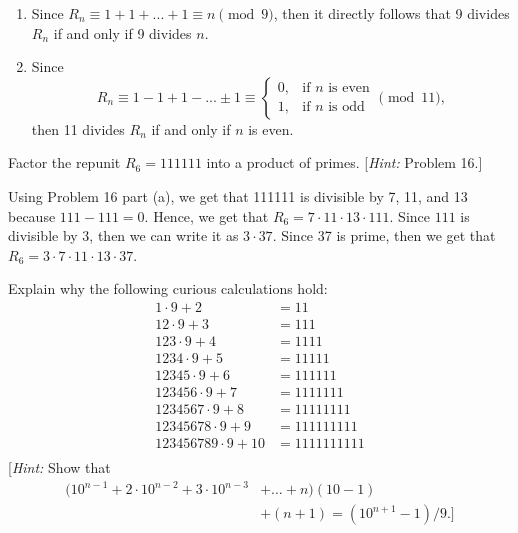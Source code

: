 \begin{solution}
    \begin{enumerate}
        \item Since $R_n \equiv 1 + 1 + ... + 1 \equiv n \pmod 9$, then it directly follows that 9 divides $R_n$ if and only if 9 divides $n$.
        \item Since
        $$R_n \equiv 1 - 1 + 1 - ... \pm 1 \equiv \begin{cases}
            0, & \text{if } n \text{ is even} \\
            1, & \text{if } n \text{ is odd}
        \end{cases} \pmod{11},$$ 
        then 11 divides $R_n$ if and only if $n$ is even. \\
    \end{enumerate}
\end{solution}

\begin{exercise}
    Factor the repunit $R_6 = 111111$ into a product of primes. [\textit{Hint:} Problem 16.] \\
\end{exercise}

\begin{solution}
    Using Problem 16 part (a), we get that 111111 is divisible by 7, 11, and 13 because $111 - 111 = 0$. Hence, we get that $R_6 = 7 \cdot 11 \cdot 13 \cdot 111$. Since $111$ is divisible by 3, then we can write it as $3 \cdot 37$. Since 37 is prime, then we get that $R_6 = 3\cdot 7 \cdot 11 \cdot 13 \cdot 37$. \\
\end{solution}

\begin{exercise}
    Explain why the following curious calculations hold:
    \begin{align*}
        1 \cdot 9 + 2 &= 11 \\
        12 \cdot 9 + 3 &= 111 \\
        123 \cdot 9 + 4 &= 1111 \\
        1234 \cdot 9 + 5 &= 11111 \\
        12345 \cdot 9 + 6 &= 111111 \\
        123456 \cdot 9 + 7 &= 1111111 \\
        1234567 \cdot 9 + 8 &= 11111111 \\
        12345678 \cdot 9 + 9 &= 111111111 \\
        123456789 \cdot 9 + 10 &= 1111111111 \\
    \end{align*}
    [\textit{Hint:} Show that
    \begin{align*}
        (10^{n-1} + 2\cdot 10^{n-2} + 3\cdot 10^{n-3} &+ \dots + n)(10 - 1) \\
        & + (n+1) = (10^{n+1} - 1)/9.]\\
    \end{align*}
\end{exercise}

